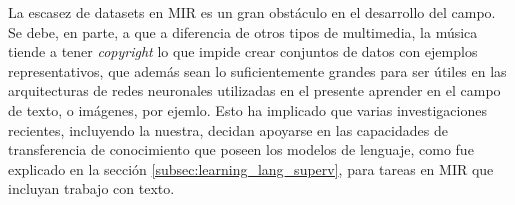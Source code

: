 La escasez de datasets en MIR es un gran obstáculo en el desarrollo del campo. Se debe, en parte, a que a diferencia de otros tipos de multimedia, la música tiende a tener \textit{copyright} lo que impide crear conjuntos de datos con ejemplos representativos, que además sean lo suficientemente grandes para ser útiles en las arquitecturas de redes neuronales utilizadas en el presente aprender en el campo de texto, o imágenes, por ejemlo. Esto ha implicado que varias investigaciones recientes, incluyendo la nuestra, decidan apoyarse en las capacidades de transferencia de conocimiento que poseen los modelos de lenguaje, como fue explicado en la sección \ref{subsec:learning_lang_superv}, para tareas en MIR que incluyan trabajo con texto.
